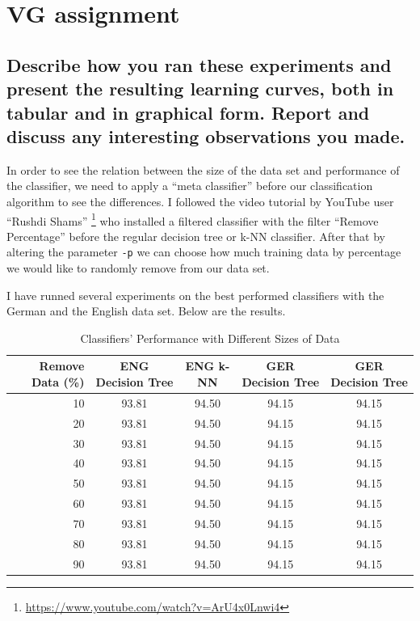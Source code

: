 \documentclass[11pt]{article} %
\begin{document}
\section{VG assignment}

\subsection{Describe how you ran these experiments and present the resulting learning curves, both in tabular and in graphical form. Report and discuss any interesting observations you made.}

In order to see the relation between the size of the data set and performance of the classifier, we need to apply a ``meta classifier'' before our classification algorithm to see the differences. I followed the video tutorial by YouTube user ``Rushdi Shams'' \footnote{\url{https://www.youtube.com/watch?v=ArU4x0Lnwi4}} who installed a filtered classifier with the filter ``Remove Percentage'' before the regular decision tree or k-NN classifier. After that by altering the parameter \verb|-p| we can choose how much training data by percentage we would like to randomly remove from our data set.

I have runned several experiments on the best performed classifiers with the German and the English data set. Below are the results.

\begin{table}[h]
    \begin{center}
        \caption{Classifiers' Performance with Different Sizes of Data}
        \label{tab:table1}
        \begin{tabular}{r|c|c|c|c}
            \textbf{Remove Data (\%)} & \textbf{ENG Decision Tree} & \textbf{ENG k-NN} & \textbf{GER Decision Tree} & \textbf{GER Decision Tree}\\
            \hline
            10 & 93.81 & 94.50 & 94.15 & 94.15\\
            20 & 93.81 & 94.50 & 94.15 & 94.15\\
            30 & 93.81 & 94.50 & 94.15 & 94.15\\
            40 & 93.81 & 94.50 & 94.15 & 94.15\\
            50 & 93.81 & 94.50 & 94.15 & 94.15\\
            60 & 93.81 & 94.50 & 94.15 & 94.15\\
            70 & 93.81 & 94.50 & 94.15 & 94.15\\
            80 & 93.81 & 94.50 & 94.15 & 94.15\\
            90 & 93.81 & 94.50 & 94.15 & 94.15\\
        \end{tabular}
    \end{center}
\end{table}
\end{document}
